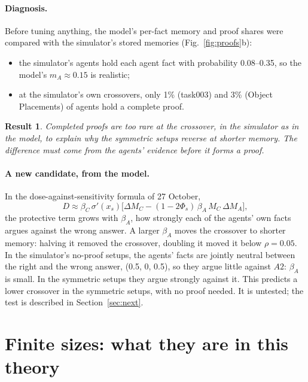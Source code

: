 \documentclass[10pt,a4paper]{article}
\newtheorem{result}{Result}
\begin{document}
\paragraph{Diagnosis.} Before tuning anything, the model's per-fact memory and proof shares were compared with the
simulator's stored memories (Fig.~\ref{fig:proofs}b):
\begin{itemize}
\item the simulator's agents hold each agent fact with probability 0.08--0.35, so the model's $m_A\approx0.15$ is
  realistic;
\item at the simulator's own crossovers, only 1\% (task003) and 3\% (Object Placements) of agents hold a complete proof.
\end{itemize}

\begin{result}
Completed proofs are too rare at the crossover, in the simulator as in the model, to explain why the symmetric setups
reverse at shorter memory. The difference must come from the agents' evidence \emph{before} it forms a proof.
\end{result}

\paragraph{A new candidate, from the model.} In the dose-against-sensitivity formula of 27 October,
\begin{equation}
D\approx\beta_C\,\sigma'(x_s)\Big[\Delta M_C-(1-2\Phi_s)\,\beta_A\,M_C\,\Delta M_A\Big],\label{eq:D}
\end{equation}
the protective term grows with $\beta_A$, how strongly each of the agents' own facts argues against the wrong answer. A
larger $\beta_A$ moves the crossover to shorter memory: halving it removed the crossover, doubling it moved it below
$\rho=0.05$. In the simulator's no-proof setups, the agents' facts are jointly neutral between the right and the wrong
answer, (0.5, 0, 0.5), so they argue little against $A2$: $\beta_A$ is small. In the symmetric setups they argue
strongly against it. This predicts a lower crossover in the symmetric setups, with no proof needed. It is untested; the
test is described in Section~\ref{sec:next}.

\section{Finite sizes: what they are in this theory}
\end{document}
